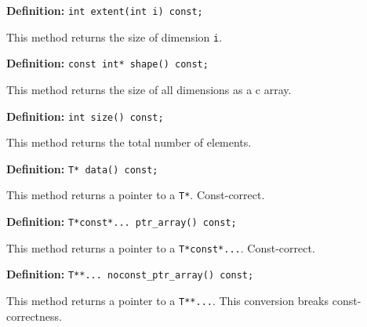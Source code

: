 \documentclass[11pt,twoside]{article}
\begin{document}
\noindent\textbf{Definition:} \texttt{int extent(int i) const;}

This method returns the size of dimension \texttt{i}.

\noindent\textbf{Definition:} \texttt{const int* shape() const;}

This method returns the size of all dimensions as a c array. 

\noindent\textbf{Definition:} \texttt{int size() const;}

This method returns the total number of elements.


\noindent\textbf{Definition:} \texttt{T* data() const;}

This method returns a pointer to a \texttt{T*}. Const-correct.


\noindent\textbf{Definition:} \texttt{T*const*... ptr\_array() const;}

This method returns a pointer to a \texttt{T*const*...}. Const-correct.


\noindent\textbf{Definition:} \texttt{T**... noconst\_ptr\_array() const;}

This method returns a pointer to a \texttt{T**...}. This conversion breaks const-correctness.%
\end{document}
